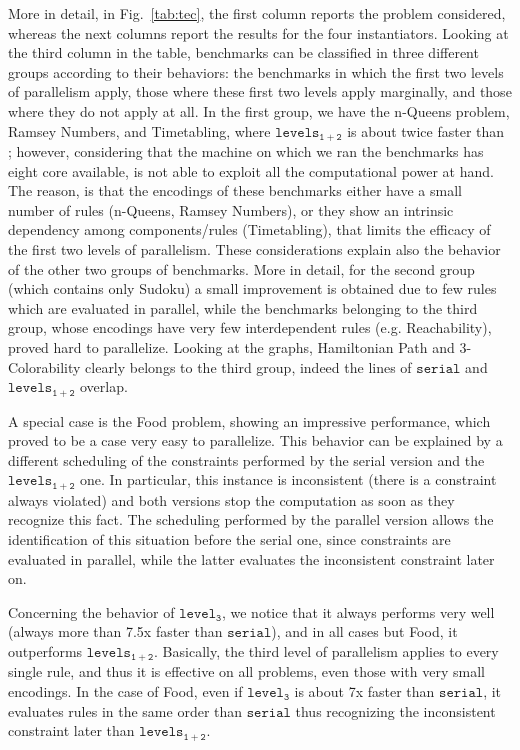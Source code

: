 \documentclass[preprint]{tlp}
\newcommand{\serial}{\ensuremath{\mathtt{serial}}\xspace}
\newcommand{\kali}{\ensuremath{\mathtt{levels_{1\!+\!2}}}\xspace}
\newcommand{\splitonly}{\ensuremath{\mathtt{level_3}}\xspace}
\begin{document}
More in detail, in Fig.~\ref{tab:tec},
the first column reports the problem considered, whereas the next columns report
the results for the four instantiators.
Looking at the third column in the table, benchmarks can be classified in three different groups
according to their behaviors: the benchmarks in which the first two levels of parallelism
apply, those where these first two levels apply marginally, and those where they do not apply at all.
In the first group, we have the n-Queens problem, Ramsey Numbers, and Timetabling,
where \kali is about twice faster than ; however,
considering that the machine on which we ran the benchmarks has eight core available,
 is not able to exploit all the computational power at hand.
The reason, is that the encodings of these benchmarks either have a small number of rules
(n-Queens, Ramsey Numbers), or they show an intrinsic dependency among
components/rules (Timetabling), that limits the efficacy of the first two levels of parallelism.
These considerations explain also the behavior of the other two groups of benchmarks. More in detail, for the second group (which contains only Sudoku)
a small improvement is obtained due to few rules which are evaluated in parallel, while the benchmarks belonging to the third group, whose encodings have very few interdependent rules (e.g. Reachability), proved hard to parallelize. Looking at the graphs, Hamiltonian Path and 3-Colorability clearly belongs to the third group, indeed the lines of \serial and \kali overlap.

A special case is the Food problem, showing an impressive performance,
which proved to be a case very easy to parallelize.
This behavior can be explained by a different scheduling of the constraints performed
by the serial version and the \kali one. In particular, this instance is inconsistent
(there is a constraint always violated) and both versions stop the
computation as soon as they recognize this fact. The scheduling
performed by the parallel version allows the identification of this situation before
the serial one, since constraints are evaluated in parallel, while the latter
evaluates the inconsistent constraint later on.


Concerning the behavior of \splitonly, we notice that it always performs very well (always more than 7.5x faster than \serial), and
in all cases but Food, it outperforms \kali.
Basically, the third level of parallelism applies to every single rule, and thus it is effective on all problems, even those with very small encodings.
In the case of Food, even if \splitonly is about 7x faster than \serial, it evaluates rules in the same order than \serial thus recognizing the inconsistent constraint
later than \kali.
\end{document}
